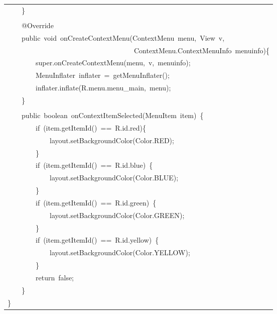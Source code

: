 \documentclass[a4paper,12pt]{article}
\begin{document}
\begin{longtable}{|p{}|}
{\ttfamily\small \ \ \ \ \}} \\
\strut \\
{\ttfamily\small \ \ \ \ @Override} \\
{\ttfamily\small \ \ \ \ public\ void\ onCreateContextMenu(ContextMenu\ menu,\ View\ v,\ } \\
{\ttfamily\small \ \ \ \ \ \ \ \ \ \ \ \ \ \ \ \ \ \ \ \ \ \ \ \ \ \ \ \ \ \ \ \ \ \ \ \ ContextMenu.ContextMenuInfo\ menuinfo)\{} \\
{\ttfamily\small \ \ \ \ \ \ \ \ super.onCreateContextMenu(menu,\ v,\ menuinfo);} \\
{\ttfamily\small \ \ \ \ \ \ \ \ MenuInflater\ inflater\ =\ getMenuInflater();} \\
{\ttfamily\small \ \ \ \ \ \ \ \ inflater.inflate(R.menu.menu\_main,\ menu);} \\
{\ttfamily\small \ \ \ \ \}} \\
\strut \\
{\ttfamily\small \ \ \ \ public\ boolean\ onContextItemSelected(MenuItem\ item)\ \{} \\
{\ttfamily\small \ \ \ \ \ \ \ \ if\ (item.getItemId()\ ==\ R.id.red)\{} \\
{\ttfamily\small \ \ \ \ \ \ \ \ \ \ \ \ layout.setBackgroundColor(Color.RED);} \\
{\ttfamily\small \ \ \ \ \ \ \ \ \}} \\
{\ttfamily\small \ \ \ \ \ \ \ \ if\ (item.getItemId()\ ==\ R.id.blue)\ \{} \\
{\ttfamily\small \ \ \ \ \ \ \ \ \ \ \ \ layout.setBackgroundColor(Color.BLUE);} \\
{\ttfamily\small \ \ \ \ \ \ \ \ \}} \\
{\ttfamily\small \ \ \ \ \ \ \ \ if\ (item.getItemId()\ ==\ R.id.green)\ \{} \\
{\ttfamily\small \ \ \ \ \ \ \ \ \ \ \ \ layout.setBackgroundColor(Color.GREEN);} \\
{\ttfamily\small \ \ \ \ \ \ \ \ \}} \\
{\ttfamily\small \ \ \ \ \ \ \ \ if\ (item.getItemId()\ ==\ R.id.yellow)\ \{} \\
{\ttfamily\small \ \ \ \ \ \ \ \ \ \ \ \ layout.setBackgroundColor(Color.YELLOW);} \\
{\ttfamily\small \ \ \ \ \ \ \ \ \}} \\
{\ttfamily\small \ \ \ \ \ \ \ \ return\ false;} \\
{\ttfamily\small \ \ \ \ \}} \\
{\ttfamily\small \}} \\

\end{longtable}
\end{document}
